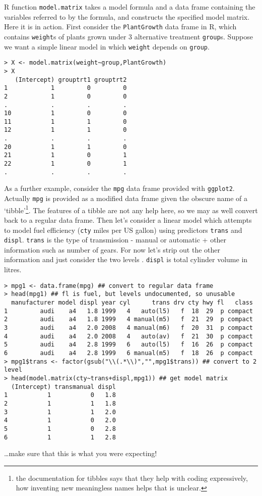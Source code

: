 \documentclass[10pt] {article}
\theoremstyle{definition}
\begin{document}
R function {\tt model.matrix} takes a model formula and a data frame containing the variables referred to by the formula, and constructs the specified model matrix. Here it is in action. First consider the {\tt PlantGrowth} data frame in R, which contains {\tt weight}s of plants grown under 3 alternative treatment {\tt group}s. Suppose we want a simple linear model in which {\tt weight} depends on {\tt group}.
\begin{lstlisting}
> X <- model.matrix(weight~group,PlantGrowth)
> X
   (Intercept) grouptrt1 grouptrt2
1            1         0         0
2            1         0         0
.            .         .         .
10           1         0         0
11           1         1         0
12           1         1         0
.            .         .         .
20           1         1         0
21           1         0         1
22           1         0         1
.            .         .         .
\end{lstlisting}
As a further example, consider the {\tt mpg} data frame provided with {\tt ggplot2}. Actually {\tt mpg} is provided as a modified data frame given the obscure name of a `tibble'\footnote{the documentation for tibbles says that they help with  coding expressively, how inventing new meaningless names helps that is unclear.}. The features of a tibble are not any help here, so we may as well convert back to a regular data frame. Then let's consider a linear model which attempts to model fuel efficiency ({\tt cty} miles per US gallon) using predictors {\tt trans} and {\tt displ}. {\tt trans} is the type of transmission - manual or automatic + other information such as number of gears. For now let's strip out the other information and just consider the two levels . {\tt displ} is total cylinder volume in litres.  
{\small \begin{verbatim}
> mpg1 <- data.frame(mpg) ## convert to regular data frame
> head(mpg1) ## fl is fuel, but levels undocumented, so unusable
  manufacturer model displ year cyl      trans drv cty hwy fl   class
1         audi    a4   1.8 1999   4   auto(l5)   f  18  29  p compact
2         audi    a4   1.8 1999   4 manual(m5)   f  21  29  p compact
3         audi    a4   2.0 2008   4 manual(m6)   f  20  31  p compact
4         audi    a4   2.0 2008   4   auto(av)   f  21  30  p compact
5         audi    a4   2.8 1999   6   auto(l5)   f  16  26  p compact
6         audi    a4   2.8 1999   6 manual(m5)   f  18  26  p compact
> mpg1$trans <- factor(gsub("\\(.*\\)","",mpg1$trans)) ## convert to 2 level
> head(model.matrix(cty~trans+displ,mpg1)) ## get model matrix
  (Intercept) transmanual displ
1           1           0   1.8
2           1           1   1.8
3           1           1   2.0
4           1           0   2.0
5           1           0   2.8
6           1           1   2.8
\end{verbatim}}
\noindent \ldots make sure that this is what you were expecting!
\end{document}
